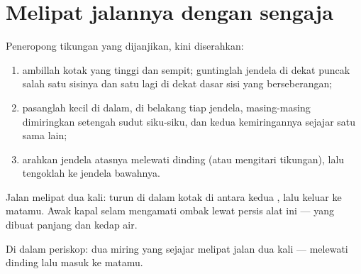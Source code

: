 \section{Melipat jalannya dengan sengaja}

\begin{method}\label{met:g5:mirrors-reflection:periscope}
Peneropong tikungan yang dijanjikan, kini diserahkan:
\begin{enumerate}
  \item ambillah kotak yang tinggi dan sempit; guntinglah jendela di
        dekat puncak salah satu sisinya dan satu lagi di dekat dasar
        sisi yang berseberangan;
  \item pasanglah  kecil di dalam, di belakang tiap jendela,
        masing-masing dimiringkan setengah sudut siku-siku, dan kedua
        kemiringannya sejajar satu sama lain;
  \item arahkan jendela atasnya melewati dinding (atau mengitari
        tikungan), lalu tengoklah ke jendela bawahnya.
\end{enumerate}
Jalan  melipat dua kali: turun di dalam kotak di antara kedua
, lalu keluar ke matamu. Awak kapal selam mengamati ombak
lewat persis alat ini --- yang dibuat panjang dan kedap air.
\end{method}

\begin{omfigure}

{\small Di dalam periskop: dua  miring yang sejajar melipat
jalan  dua kali --- melewati dinding lalu masuk ke matamu.}
\end{omfigure}

